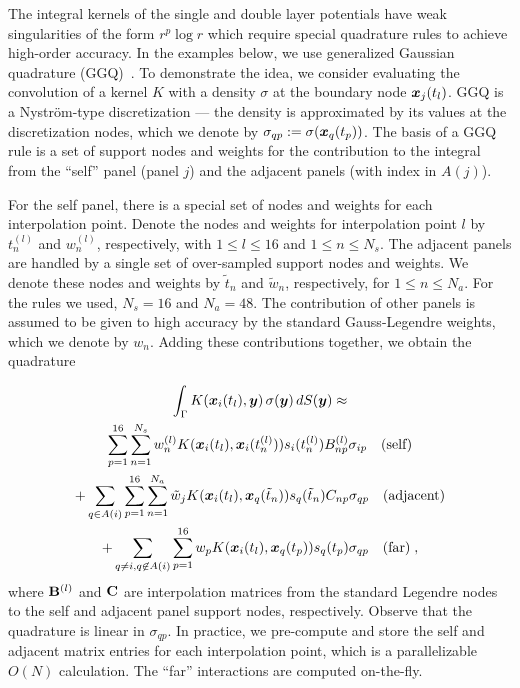 The integral kernels of the single and
double layer potentials have weak
singularities of the form $r^p\log r$
which require special quadrature rules to
achieve high-order accuracy.
%
In the examples below, we use generalized
Gaussian quadrature (GGQ)~\cite{bremer2010}.
%
To demonstrate the idea, we consider
evaluating the convolution of a kernel
$K$ with a density $\sigma$
at the boundary node ${\boldsymbol x}_j(t_l)$.
%
GGQ is a Nystr\"{o}m-type discretization ---
the density is approximated 
by its values at the discretization nodes,
which we denote by
$\sigma_{qp} := \sigma({\boldsymbol x}_q(t_p))$.
%
The basis of a GGQ rule is a set of 
support nodes and weights for the
contribution to the integral from the
``self'' panel (panel $j$) and the adjacent
panels (with index in $A(j)$).
%

For the self panel, there is a special set
of nodes and weights for each interpolation
point. Denote the nodes and weights
for interpolation point $l$ by $t^{(l)}_{n}$
and $w^{(l)}_{n}$, respectively, with
$1\leq l \leq 16$ and $1\leq n \leq N_s$.
%
The adjacent panels are handled by a single
set of over-sampled support nodes and weights.
We denote these nodes and weights
by $\tilde{t}_n$ and $\tilde{w}_n$, respectively,
for $1 \leq n \leq N_a$.
%
For the rules we used, $N_s = 16$ and
$N_a = 48$.
%
The contribution of other panels is assumed
to be given to high accuracy by the standard
Gauss-Legendre weights, which we denote
by $w_n$.
%
Adding these contributions together, we obtain the
quadrature

\begin{multline}
  \int_\Gamma K({\boldsymbol x}_i(t_l),{\boldsymbol y}) \, \sigma({\boldsymbol y})
  \, dS({\boldsymbol y}) \approx \\
  \sum_{p=1}^{16} \sum_{n=1}^{N_s}
  w^{(l)}_{n} K({\boldsymbol x}_i(t_l),{\boldsymbol x}_i({t}^{(l)}_{n}))
  s_i({t}^{(l)}_{n}) B^{(l)}_{np} \sigma_{ip} \quad \textrm{(self)}
  \\
  + \sum_{q\in A(i)} \sum_{p=1}^{16} \sum_{n=1}^{N_a}
  \tilde{w}_jK({\boldsymbol x}_i(t_l),{\boldsymbol x}_q(\tilde{t}_n)) s_q(\tilde{t}_n)
  C_{np} \sigma_{qp}
  \quad \textrm{(adjacent)} \\
  + \sum_{q\neq i, q\not\in A(i)} \sum_{p=1}^{16}
  w_p K({\boldsymbol x}_i(t_l),{\boldsymbol x}_q(t_p)) s_q(t_p)
  \sigma_{qp} \quad \textrm{(far)} \nonumber \; ,
\end{multline}
where ${\bf B}^{(l)}$ and ${\bf C}$ are interpolation
matrices from the standard Legendre nodes
to the self and adjacent panel support nodes,
respectively. Observe that the quadrature is
linear in $\sigma_{qp}$. In practice, we pre-compute
and store the self and adjacent matrix entries for each
interpolation point, which is a parallelizable
$O(N)$ calculation. The ``far'' interactions
are computed on-the-fly.

